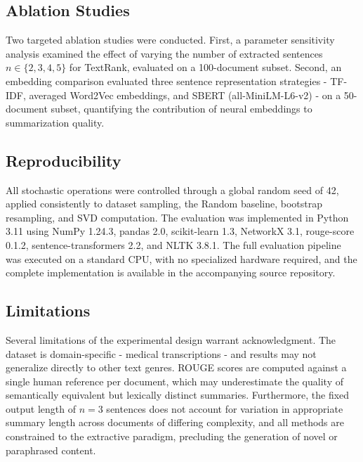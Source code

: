 \documentclass[12pt,twoside,en,win]{bmzhart}
\begin{document}
	\subsection{Ablation Studies}

	Two targeted ablation studies were conducted. First, a parameter sensitivity analysis examined the effect of 
	varying the number of extracted sentences $n \in \{2, 3, 4, 5\}$  for TextRank, evaluated on a 100-document 
	subset. Second, an embedding comparison evaluated three sentence representation strategies - TF-IDF, averaged 
	Word2Vec embeddings, and SBERT (all-MiniLM-L6-v2) - on a 50-document subset, quantifying the contribution of 
	neural embeddings to summarization quality.

	\subsection{Reproducibility}

	All stochastic operations were controlled through a global random seed of 42, applied consistently to dataset 
	sampling, the Random baseline, bootstrap resampling, and SVD computation. The evaluation was implemented in 
	Python 3.11 using NumPy 1.24.3, pandas 2.0, scikit-learn 1.3, NetworkX 3.1, rouge-score 0.1.2, sentence-transformers 2.2, 
	and NLTK 3.8.1. The full evaluation pipeline was executed on a standard CPU, with no specialized hardware required, 
	and the complete implementation is available in the accompanying source repository.

	\subsection{Limitations}

	Several limitations of the experimental design warrant acknowledgment. The dataset is domain-specific - medical 
	transcriptions - and results may not generalize directly to other text genres. ROUGE scores are computed against a 
	single human reference per document, which may underestimate the quality of semantically equivalent but lexically 
	distinct summaries. Furthermore, the fixed output length of $n=3$ sentences does not account for variation in 
	appropriate summary length across documents of differing complexity, and all methods are constrained to the extractive 
	paradigm, precluding the generation of novel or paraphrased content.
\end{document}
